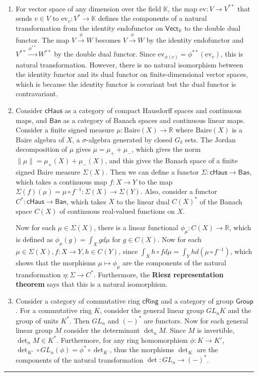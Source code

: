 \begin{exmp}
~\begin{enumerate}
\item For vector space of any dimension over the field $\mathbb{K}$, the map $\mathrm{ev}:V\rightarrow V^{**}$ that sends $v\in V$ to $\mathrm{ev}_v:V^*\rightarrow \mathbb{K}$ defines the components of a natural transformation from the identity endofunctor on $\mathsf{Vect}_{\mathbb{K}}$ to the double dual functor. The map $V\xrightarrow{\phi}W$ becomes $V\xrightarrow{\phi}W$ by the identity endofunctor and $V^{**}\xrightarrow{\phi^{**}}W^{**}$ by the double dual functor. Since $\mathrm{ev}_{\phi (v)}=\phi^{**}(\mathrm{ev}_v)$, this is natural transformation. However, there is no natural isomorphism between the identity functor and its dual functor on finite-dimensional vector spaces, which is because the identity functor is covariant but the dual functor is contravariant.
\item Consider $\mathsf{cHaus}$ as a category of compact Hausdorff spaces and continuous maps, and $\mathsf{Ban}$ as a category of Banach spaces and continuous linear maps. Consider a finite signed measure $\mu:\textrm{Baire}(X)\rightarrow \mathbb{R}$ where $\textrm{Baire}(X)$ is a Baire algebra of $X$, a $\sigma$-algebra generated by closed $G_\delta$ sets. The Jordan decomposition of $\mu$ gives $\mu=\mu_++\mu_-$, which gives the norm $\|\mu\|=\mu_+(X)+\mu_-(X)$, and this gives the Banach space of a finite signed Baire measure $\Sigma(X)$. Then we can define a functor $\Sigma:\mathsf{cHaus}\rightarrow \mathsf{Ban}$, which takes a continuous map $f:X\rightarrow Y$ to the map $\Sigma(f)(\mu)=\mu\circ f^{-1}:\Sigma (X)\rightarrow \Sigma(Y)$. Also, consider a functor $C^*:\mathsf{cHaus}\rightarrow \mathsf{Ban}$, which takes $X$ to the linear dual $C(X)^*$ of the Banach space $C(X)$ of continuous real-valued functions on $X$.

Now for each $\mu\in \Sigma(X)$, there is a linear functional $\phi_\mu:C(X)\rightarrow \mathbb{R}$, which is defined as $\phi_\mu(g)=\int_X g d\mu$ for $g\in C(X)$. Now for each $\mu\in \Sigma(X),f:X\rightarrow Y, h\in C(Y)$, since $\int_X h\circ f d\mu=\int_Y h d(\mu\circ f^{-1})$, which shows that the morphisms $\mu\mapsto \phi_\mu$ are the components of the natural transformation $\eta:\Sigma\rightarrow C^*$. Furthermore, the \textbf{Riesz representation theorem} says that this is a natural isomorphism.

\item Consider a category of commutative ring $\mathsf{cRing}$ and a category of group $\mathsf{Group}$. For a commutative ring $K$, consider the general linear group $GL_n K$ and the group of units $K^*$. Then $GL_n$ and $(-)^*$ are functors. Now for each general linear group $M$ consider the determinant $\det_n M$. Since $M$ is invertible, $\det_n M\in K^*$. Furthermore, for any ring homomorphism $\phi:K\rightarrow K'$, $\det_{K'}\circ GL_n(\phi)=\phi^*\circ \det_{K}$, thus the morphisms $\det_K$ are the components of the natural transformation $\det:GL_n\rightarrow (-)^*$.
\end{enumerate}
\end{exmp}
\noindent\rule{\textwidth}{1pt}
\newline
